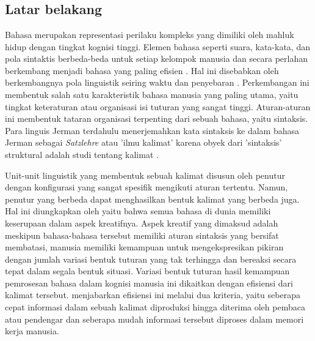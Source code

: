                 
\onehalfspacing
\chapter{\babSatu}

\section{Latar belakang}
Bahasa merupakan representasi perilaku kompleks yang dimiliki oleh mahluk hidup dengan tingkat kognisi tinggi. Elemen bahasa seperti suara, kata-kata, dan pola sintaktis berbeda-beda untuk setiap kelompok manusia dan secara perlahan berkembang menjadi bahasa yang paling efisien \citep{aitchison2004change}. Hal ini disebabkan oleh berkembangnya pola linguistik seiring waktu dan penyebaran \citep{sapir1921intro}. Perkembangan ini membentuk salah satu karakteristik bahasa manusia yang paling utama, yaitu tingkat keteraturan atau organisasi isi tuturan yang sangat tinggi. Aturan-aturan ini membentuk tataran organisasi terpenting dari sebuah bahasa, yaitu sintaksis. Para linguis Jerman terdahulu menerjemahkan kata sintaksis ke dalam bahasa Jerman sebagai \textit{Satzlehre} atau 'ilmu kalimat' karena obyek dari 'sintaksis' struktural adalah studi tentang kalimat \citep{tesniere1959elements}.

Unit-unit linguistik yang membentuk sebuah kalimat disusun oleh penutur dengan konfigurasi yang sangat spesifik mengikuti aturan tertentu. Namun, penutur yang berbeda dapat menghasilkan bentuk kalimat yang berbeda juga. Hal ini diungkapkan oleh \cite{chomsky1965syntactic} yaitu bahwa semua bahasa di dunia memiliki keserupaan dalam aspek kreatifnya. Aspek kreatif yang dimaksud adalah meskipun bahasa-bahasa tersebut memiliki aturan sintaksis yang bersifat membatasi, manusia memiliki kemampuan untuk mengekspresikan pikiran dengan jumlah variasi bentuk tuturan yang tak terhingga dan bereaksi secara tepat dalam segala bentuk situasi. Variasi bentuk tuturan hasil kemampuan pemrosesan bahasa dalam kognisi manusia ini dikaitkan dengan efisiensi dari kalimat tersebut. \cite{hawkins2014cross} menjabarkan efisiensi ini melalui dua kriteria, yaitu seberapa cepat informasi dalam sebuah kalimat diproduksi hingga diterima oleh pembaca atau pendengar dan seberapa mudah informasi tersebut diproses dalam memori kerja manusia.

